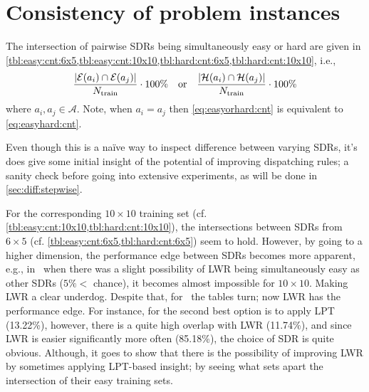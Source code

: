 {\setlength{\tabcolsep}{3pt} 
  
  
}

\section{Consistency of problem instances}
The intersection of pairwise SDRs being simultaneously easy or hard are given in \cref{tbl:easy:cnt:6x5,tbl:easy:cnt:10x10,tbl:hard:cnt:6x5,tbl:hard:cnt:10x10}, i.e., 
\begin{equation}\label{eq:easyorhard:cnt}
  \frac{\abs{\mathcal{E}(a_i)\cap \mathcal{E}(a_j) }}{N_{\text{train}}} \cdot 
  100\%
  \quad \text{or} \quad 
  \frac{\abs{\mathcal{H}(a_i)\cap \mathcal{H}(a_j)}}{N_{\text{train}}}\cdot 
  100\%
\end{equation}
where $a_i,a_j\in\mathcal{A}$. Note, when $a_i=a_j$ then \cref{eq:easyorhard:cnt} is equivalent to \cref{eq:easyhard:cnt}.

{\setlength{\tabcolsep}{3pt} 
  
  
  
  
  
}

Even though this is a na\"ive way to inspect difference between varying SDRs, it's does give some initial insight of the potential of improving dispatching rules; a sanity check before going into extensive experiments, as will be done in \cref{sec:diff:stepwise}.

For the corresponding $10\times10$ training set (cf. \cref{tbl:easy:cnt:10x10,tbl:hard:cnt:10x10}), the intersections between SDRs from $6\times5$ (cf. \cref{tbl:easy:cnt:6x5,tbl:hard:cnt:6x5}) seem to hold. 
However, by going to a higher dimension, the performance edge between SDRs becomes more apparent, e.g., in \JSP\ when there was a slight possibility of LWR being simultaneously easy as other SDRs ($5\%<$ chance), it becomes almost impossible for $10\times10$. 
Making LWR a clear underdog. 
Despite that, for \FSP\ the tables turn; now LWR has the performance edge. 
For instance, for  the second  best option is to apply LPT 
(13.22\%), however, there is a quite high overlap with LWR (11.74\%), and since 
LWR is easier significantly more often (85.18\%), the choice of SDR is quite 
obvious. 
Although, it goes to show that there is the possibility of improving LWR by sometimes applying LPT-based insight; by seeing what sets apart the intersection of their easy training sets. 

